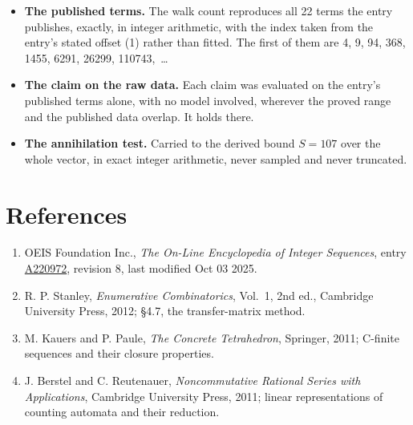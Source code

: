 \documentclass[11pt]{article}
\theoremstyle{definition}
\begin{document}
\begin{itemize}

\item {\bfseries The published terms.} The walk count reproduces all 22 terms the entry publishes, exactly, in integer arithmetic, with the index taken from the entry's stated offset (1) rather than fitted. The first of them are 4, 9, 94, 368, 1455, 6291, 26299, 110743,~\dots

\item {\bfseries The claim on the raw data.} Each claim was evaluated on the entry's published terms alone, with no model involved, wherever the proved range and the published data overlap. It holds there.

\item {\bfseries The annihilation test.} Carried to the derived bound $S = 107$ over the whole vector, in exact integer arithmetic, never sampled and never truncated.

\end{itemize}

\section{References}

\begin{enumerate}

\item OEIS Foundation Inc., \emph{The On-Line Encyclopedia of Integer Sequences}, entry \href{https://oeis.org/A220972}{A220972}, revision 8, last modified Oct 03 2025.

\item R. P. Stanley, \emph{Enumerative Combinatorics}, Vol.~1, 2nd ed., Cambridge University Press, 2012; \S4.7, the transfer-matrix method.

\item M. Kauers and P. Paule, \emph{The Concrete Tetrahedron}, Springer, 2011; C-finite sequences and their closure properties.

\item J. Berstel and C. Reutenauer, \emph{Noncommutative Rational Series with Applications}, Cambridge University Press, 2011; linear representations of counting automata and their reduction.

\end{enumerate}
\end{document}
